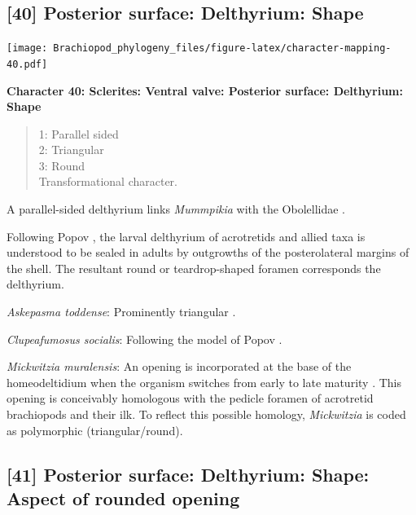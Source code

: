 \documentclass[openany]{book}
\theoremstyle{definition}
\theoremstyle{definition}
\theoremstyle{definition}
\theoremstyle{remark}
\begin{document}
\subsection*{{[}40{]} Posterior surface: Delthyrium:
Shape}\label{posterior-surface-delthyrium-shape}

\texttt{[image: Brachiopod\_phylogeny\_files/figure-latex/character-mapping-40.pdf]}

\textbf{Character 40: Sclerites: Ventral valve: Posterior surface:
Delthyrium: Shape}

\begin{quote}
1: Parallel sided\\
2: Triangular\\
3: Round\\
Transformational character.
\end{quote}

A parallel-sided delthyrium links \emph{Mummpikia} with the Obolellidae
\citep{Balthasar2008iMummpikia}.

Following Popov \citeyearpar{Popov1992TheCambrian}, the larval
delthyrium of acrotretids and allied taxa is understood to be sealed in
adults by outgrowths of the posterolateral margins of the shell. The
resultant round or teardrop-shaped foramen corresponds the delthyrium.

\hypertarget{Askepasma_toddense-coding-40}{}
\emph{Askepasma toddense}: Prominently triangular \citep[see][fig.
2]{Topper2013Theoldest}.

\hypertarget{Clupeafumosus_socialis-coding-40}{}
\emph{Clupeafumosus socialis}: Following the model of Popov
\citeyearpar{Popov1992TheCambrian}.

\hypertarget{Mickwitzia_muralensis-coding-40}{}
\emph{Mickwitzia muralensis}: An opening is incorporated at the base of
the homeodeltidium when the organism switches from early to late
maturity \citep[fig. 10 in][]{Balthasar2004Shellstructure}. This opening
is conceivably homologous with the pedicle foramen of acrotretid
brachiopods and their ilk. To reflect this possible homology,
\emph{Mickwitzia} is coded as polymorphic (triangular/round).

\subsection*{{[}41{]} Posterior surface: Delthyrium: Shape: Aspect of
rounded
opening}\label{posterior-surface-delthyrium-shape-aspect-of-rounded-opening}
\end{document}
